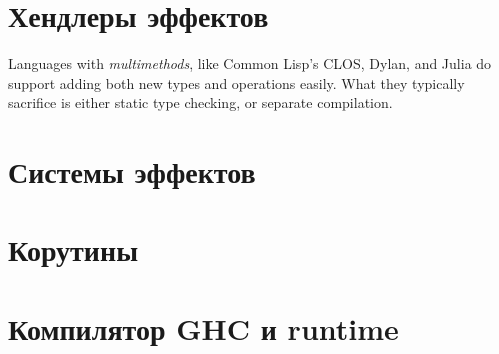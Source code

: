 \documentclass[12pt]{article}
\begin{document}



    \section{Хендлеры эффектов} \label{sec:effect-handlers}









    Languages with \textit{multimethods}, like Common Lisp’s CLOS, Dylan, and Julia do support adding both new types and operations easily.
    What they typically sacrifice is either static type checking, or separate compilation.





    \section{Системы эффектов} \label{sec:effect-systems}



    \section{Корутины}




    \section{Компилятор GHC и runtime}
\end{document}
